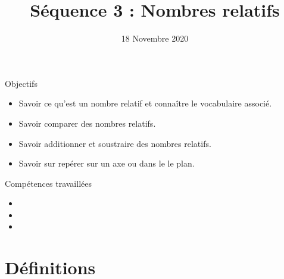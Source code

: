 \documentclass[xcolor={dvipsnames}]{beamer}
\title{Séquence 3 : Nombres relatifs}
\date{18 Novembre 2020}
\begin{document}
\begin{frame}
  \titlepage 
\end{frame}


	

\begin{frame}
	\begin{block}{Objectifs}
		\begin{itemize}
			
		\item Savoir ce qu’est un nombre relatif et connaître le vocabulaire associé.
		\item Savoir comparer des nombres relatifs.
		\item Savoir additionner et soustraire des nombres relatifs.
		\item Savoir sur repérer sur un axe ou dans le le plan.
			
			\end{itemize}
	\end{block}
\end{frame}

\begin{frame}
	\begin{block}{Compétences travaillées}
		\begin{itemize}
			\item {}%
			\item {}%
			\item {}%
		\end{itemize}
	\end{block}
\end{frame}



\section{Définitions}
\end{document}
